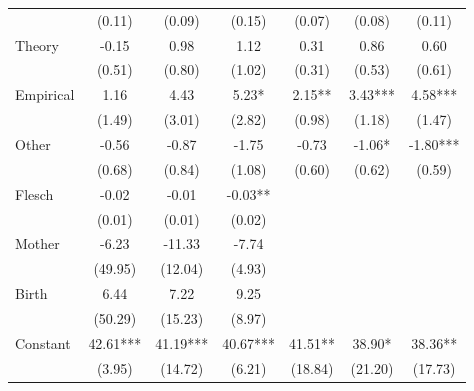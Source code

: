 \begin{table}[H]
\begin{threeparttable}
\begin{tabular}{p{3.78cm}S@{}S@{}S@{}S@{}S@{}S@{}}
                                          &      (0.11)   &      (0.09)   &      (0.15)   &      (0.07)   &      (0.08)   &      (0.11)   \\
            Theory                        &       -0.15   &        0.98   &        1.12   &        0.31   &        0.86   &        0.60   \\
                                          &      (0.51)   &      (0.80)   &      (1.02)   &      (0.31)   &      (0.53)   &      (0.61)   \\
            Empirical                     &        1.16   &        4.43   &        5.23*  &        2.15** &        3.43***&        4.58***\\
                                          &      (1.49)   &      (3.01)   &      (2.82)   &      (0.98)   &      (1.18)   &      (1.47)   \\
            Other                         &       -0.56   &       -0.87   &       -1.75   &       -0.73   &       -1.06*  &       -1.80***\\
                                          &      (0.68)   &      (0.84)   &      (1.08)   &      (0.60)   &      (0.62)   &      (0.59)   \\
            Flesch                        &       -0.02   &       -0.01   &       -0.03** &               &               &               \\
                                          &      (0.01)   &      (0.01)   &      (0.02)   &               &               &               \\
            Mother                        &       -6.23   &      -11.33   &       -7.74   &               &               &               \\
                                          &     (49.95)   &     (12.04)   &      (4.93)   &               &               &               \\
            Birth                         &        6.44   &        7.22   &        9.25   &               &               &               \\
                                          &     (50.29)   &     (15.23)   &      (8.97)   &               &               &               \\
            Constant                      &       42.61***&       41.19***&       40.67***&       41.51** &       38.90*  &       38.36** \\
                                          &      (3.95)   &     (14.72)   &      (6.21)   &     (18.84)   &     (21.20)   &     (17.73)   \\

\end{tabular}
\end{threeparttable}
\end{table}

